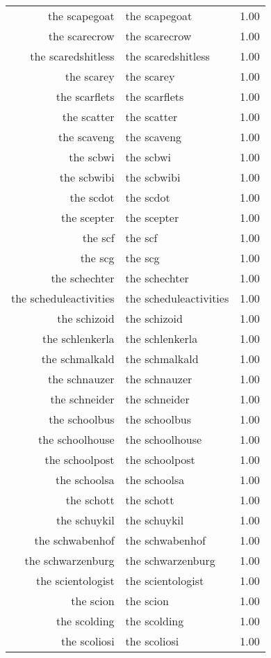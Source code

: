 \begin{table}[ht]
\begin{tabular}{rlr}
  the scapegoat & the scapegoat & 1.00 \\ 
  the scarecrow & the scarecrow & 1.00 \\ 
  the scaredshitless & the scaredshitless & 1.00 \\ 
  the scarey & the scarey & 1.00 \\ 
  the scarflets & the scarflets & 1.00 \\ 
  the scatter & the scatter & 1.00 \\ 
  the scaveng & the scaveng & 1.00 \\ 
  the scbwi & the scbwi & 1.00 \\ 
  the scbwibi & the scbwibi & 1.00 \\ 
  the scdot & the scdot & 1.00 \\ 
  the scepter & the scepter & 1.00 \\ 
  the scf & the scf & 1.00 \\ 
  the scg & the scg & 1.00 \\ 
  the schechter & the schechter & 1.00 \\ 
  the scheduleactivities & the scheduleactivities & 1.00 \\ 
  the schizoid & the schizoid & 1.00 \\ 
  the schlenkerla & the schlenkerla & 1.00 \\ 
  the schmalkald & the schmalkald & 1.00 \\ 
  the schnauzer & the schnauzer & 1.00 \\ 
  the schneider & the schneider & 1.00 \\ 
  the schoolbus & the schoolbus & 1.00 \\ 
  the schoolhouse & the schoolhouse & 1.00 \\ 
  the schoolpost & the schoolpost & 1.00 \\ 
  the schoolsa & the schoolsa & 1.00 \\ 
  the schott & the schott & 1.00 \\ 
  the schuykil & the schuykil & 1.00 \\ 
  the schwabenhof & the schwabenhof & 1.00 \\ 
  the schwarzenburg & the schwarzenburg & 1.00 \\ 
  the scientologist & the scientologist & 1.00 \\ 
  the scion & the scion & 1.00 \\ 
  the scolding & the scolding & 1.00 \\ 
  the scoliosi & the scoliosi & 1.00 \\ 

\end{tabular}
\end{table}
